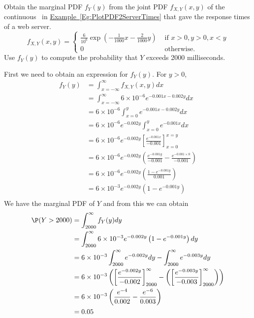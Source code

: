 \begin{example}\label{EgGetMarginalFromJointContServerTimes}
Obtain the marginal PDF $f_Y(y)$ from the joint PDF $f_{X,Y}(x,y)$ of the continuous \rv~in \hyperref[Eg:PlotPDF2ServerTimes]{Example~\ref*{Eg:PlotPDF2ServerTimes}} that gave the response times of a web server.
\[
f_{X,Y}(x,y) = 
\begin{cases}
\frac{6}{10^6} \exp \left( -\frac{1}{1000}x-\frac{2}{1000}y \right)
& \text{ if } x>0,y>0,x <y\\
0 & \text{ otherwise}.
\end{cases}
\]
Use $f_Y(y)$ to compute the probability that $Y$ exceeds 2000 milliseconds.

First we need to obtain an expression for $f_Y(y)$. For $y > 0$,
{\scriptsize
\begin{align*}
f_Y(y) 
&= \int_{x=-\infty}^{\infty} f_{X,Y}(x,y) dx\\
&= \int_{x=-\infty}^{\infty} 6 \times 10^{-6} e^{-0.001 x - 0.002y} dx\\
&= 6 \times 10^{-6} \int_{x=0}^{y} e^{-0.001 x - 0.002y} dx\\ 
&= 6 \times 10^{-6} e^{-0.002y} \int_{x=0}^{y}  e^{-0.001 x} dx\\ 
&= 6 \times 10^{-6} e^{-0.002y} \left[ \frac{e^{-0.001 x}}{-0.001}\right]_{x=0}^{x=y}\\ 
&= 6 \times 10^{-6} e^{-0.002y} \left( \frac{e^{-0.001 y}}{-0.001} - \frac{e^{-0.001 \times 0}}{-0.001} \right)\\ 
&= 6 \times 10^{-6} e^{-0.002y} \left( \frac{1- e^{-0.001 y}}{0.001} \right)\\ 
&= 6 \times 10^{-3} e^{-0.002y} \left({1- e^{-0.001 y}} \right)\\ 
\end{align*}
}
We have the marginal PDF of $Y$ and from this we can obtain 
{\scriptsize
\begin{align*}
\P(Y>2000)
&= \int_{2000}^{\infty} f_Y(y) dy \\
&= \int_{2000}^{\infty} 6 \times 10^{-3} e^{-0.002y} \left({1- e^{-0.001 y}} \right) dy\\
&= 6 \times 10^{-3} \int_{2000}^{\infty}  e^{-0.002y} dy - \int_{2000}^{\infty} e^{-0.003 y} dy\\
&= 6 \times 10^{-3} \left( \left[ \frac{e^{-0.002y}}{-0.002} \right]_{2000}^{\infty} 
- \left( \left[ \frac{e^{-0.003y}}{-0.003} \right]_{2000}^{\infty} \right) \right)\\
&= 6 \times 10^{-3} \left( \frac{e^{-4}}{0.002} - \frac{e^{-6}}{0.003} \right)\\
&= 0.05
\end{align*}
}


\end{example}
